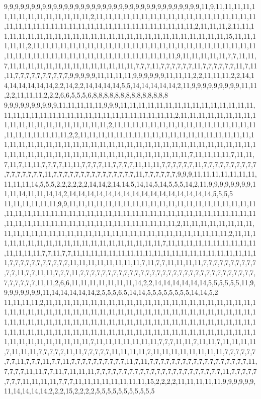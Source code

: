 9,9,9,9,9,9,9,9,9,9,9,9,9,9,9,9,9,9,9,9,9,9,9,9,9,9,9,9,9,9,9,9,9,9,9,9,11,9,11,11,11,11,11,11,11,11,11,11,11,11,11,11,2,11,11,11,11,11,11,11,11,11,11,11,11,11,11,11,11,11,11,11,11,11,11,11,11,11,11,11,11,11,11,11,11,11,11,11,11,11,11,11,2,11,11,11,2,11,11,11,11,11,11,11,11,11,11,11,11,11,11,11,11,11,11,11,11,11,11,11,11,11,11,11,15,11,11,11,11,11,2,11,11,11,11,11,11,11,11,11,11,11,11,11,11,11,11,11,11,11,11,11,11,11,11,11,11,11,11,11,11,11,11,11,11,11,11,11,11,11,11,11,11,11,11,9,11,11,11,11,11,7,7,11,11,7,11,11,11,11,11,11,11,11,11,11,11,11,11,11,7,7,7,11,7,7,7,7,7,7,11,7,7,7,7,7,7,11,7,11,11,7,7,7,7,7,7,7,7,7,7,9,9,9,9,9,11,11,11,11,9,9,9,9,9,9,11,11,11,2,2,11,11,11,2,2,14,14,14,14,14,14,14,2,2,14,2,2,14,14,14,14,5,5,14,14,14,14,14,2,11,9,9,9,9,9,9,9,9,9,11,11,2,2,11,11,11,2,2,2,6,6,5,5,5,6,8,8,8,8,8,8,8,8,8,8,8,8,8,8
9,9,9,9,9,9,9,9,9,9,11,11,11,11,11,9,9,9,11,11,11,11,11,11,11,11,11,11,11,11,11,11,11,11,11,11,11,11,11,11,11,11,11,11,11,11,11,11,11,11,11,11,2,11,11,11,11,11,11,11,11,11,11,11,11,11,11,11,11,11,11,11,11,2,11,11,11,11,11,11,11,11,11,11,11,11,11,11,11,11,11,11,11,11,11,11,11,2,2,11,11,11,11,11,11,11,11,11,11,11,11,11,11,11,11,11,11,11,11,11,11,11,11,11,11,11,11,11,11,11,11,11,11,11,11,11,11,11,11,11,11,11,11,11,11,11,11,11,11,11,11,11,11,11,11,11,11,11,11,11,11,11,11,11,11,11,11,7,11,11,11,11,7,11,11,7,11,7,11,11,7,7,7,7,11,11,7,7,7,7,11,7,7,7,7,11,11,11,7,7,7,7,7,7,11,7,7,7,7,7,7,7,7,7,7,7,7,7,7,7,7,7,11,7,7,7,7,7,7,7,7,7,7,7,7,7,7,7,11,7,7,7,7,7,7,9,9,9,11,11,11,11,11,11,11,11,11,11,14,5,5,5,2,2,2,2,2,2,14,14,2,14,14,5,14,14,5,14,5,5,5,14,2,11,9,9,9,9,9,9,9,9,11,11,14,11,11,14,14,2,14,14,14,14,14,14,14,14,14,14,14,14,14,14,14,14,5,5,5,5
11,11,11,11,11,11,9,9,11,11,11,11,11,11,11,11,11,11,11,11,11,11,11,11,11,11,11,11,11,11,11,11,11,11,11,11,11,11,11,11,11,11,11,11,11,11,11,11,11,11,11,11,11,11,11,11,11,11,11,11,11,11,11,11,11,11,11,11,11,11,11,11,11,11,11,11,2,11,11,11,11,11,11,11,11,11,11,11,11,11,11,11,11,11,11,11,11,11,11,11,11,11,11,11,11,11,11,11,11,11,2,11,11,11,11,11,11,11,11,11,11,11,11,11,11,11,11,11,11,11,11,7,11,11,11,11,11,11,11,11,11,11,11,11,11,11,7,7,11,7,7,11,11,11,11,11,11,11,11,11,11,11,11,11,11,11,11,11,11,11,11,11,7,7,7,7,7,7,7,7,7,7,7,11,11,11,11,11,11,11,11,7,11,7,7,11,11,11,11,7,7,7,7,7,7,7,7,7,7,7,7,11,7,7,11,11,7,7,7,11,7,7,7,7,7,7,7,7,7,7,7,7,7,7,7,7,7,7,7,7,7,7,7,7,7,7,7,7,7,7,7,7,7,7,7,7,7,7,11,11,2,6,6,11,11,11,11,11,11,11,14,2,2,14,14,14,14,14,14,5,5,5,5,5,5,11,9,9,9,9,9,9,9,9,11,14,14,14,14,14,2,5,5,5,6,5,14,14,5,5,5,5,5,5,5,5,14,14,5,2
11,11,11,11,2,11,11,11,11,11,11,11,11,11,11,11,11,11,11,11,11,11,11,11,11,11,11,11,11,11,11,11,11,11,11,11,11,11,11,11,11,11,11,11,11,11,11,11,11,11,11,11,11,11,11,11,11,11,11,11,11,11,11,11,11,11,11,11,11,11,11,11,11,11,11,11,11,11,11,11,11,11,11,11,11,11,11,11,11,11,11,11,11,11,11,11,11,11,11,11,11,11,11,11,11,11,11,11,11,11,11,11,11,11,11,11,11,11,11,11,11,11,7,11,11,11,11,11,11,11,7,7,7,11,11,7,11,11,7,11,11,11,11,7,11,11,11,7,7,7,7,7,11,11,7,7,7,7,7,11,11,11,11,7,11,11,11,11,11,11,11,11,7,7,7,7,7,7,7,7,11,7,7,7,11,7,7,11,7,7,7,7,7,7,7,7,7,7,11,7,11,7,7,7,7,7,7,7,7,7,7,7,7,7,7,7,7,7,7,11,7,7,7,7,11,11,7,7,11,7,11,11,11,7,7,7,7,7,7,7,7,7,7,7,7,7,7,7,7,7,7,7,7,7,7,7,11,7,7,7,7,7,7,7,7,11,11,11,11,7,7,7,11,11,11,11,11,11,11,11,15,2,2,2,2,11,11,11,11,11,9,9,9,9,9,9,11,14,14,14,14,2,2,2,15,2,2,2,2,5,5,5,5,5,5,5,5,5,5,5
